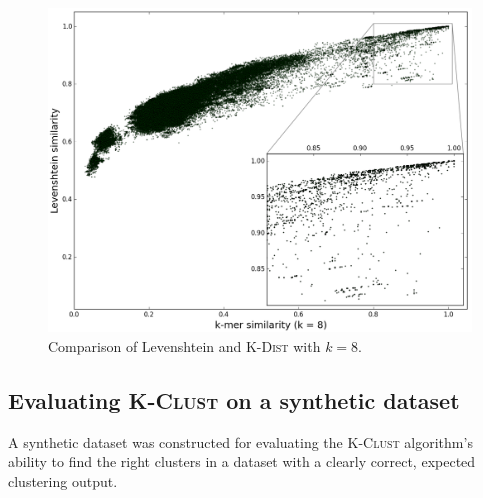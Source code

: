 %

\begin{figure}[H]
  \includegraphics[width=1.0\textwidth]{graphics/Levenshtein_K-Dist_k8.png}
  \caption{Comparison of Levenshtein and \textsc{K-Dist} with $k=8$.}
  \label{fig:k-dist_lev_similarity_k8}
  \label{fig:Levenshtein_vs_KDist}
\end{figure}


\subsection{Evaluating \textsc{K-Clust} on a synthetic dataset}
\label{sec:synth_dataset}

A synthetic dataset was constructed for evaluating the \textsc{K-Clust}
algorithm's ability to find the right clusters in a dataset with a clearly
correct, expected clustering output.

